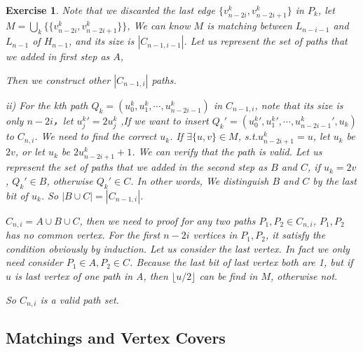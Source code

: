\documentclass[12pt,a4]{article}
\newtheorem{exercise}[theorem]{Exercise}
\begin{document}
\begin{exercise}
 Note that we discarded the last edge $\{ v_{n-2i}^k,v_{n-2i+1}^k\}$ in $P_k$, let $M = \bigcup_k \{\{v_{n-2i}^k,v_{n-2i+1}^k\}\}$, We can know $M$ is matching between $L_{n-i-1}$ and $L_{n-1}$ of 
 $H_{n-1}$, and its size is $|C_{n-1,i-1}|$. Let us represent the set of paths that we added in first step as
 $A$, 
 
 Then we construct other $|C_{n-1,i}|$ paths.
 
ii) For the kth path $Q_k = (u_0^k, u_1^k, \cdots, u_{n-2i-1}^k )$ in $C_{n-1,i}$, note that its size is only $n-2i$，let $u_j^k' = 2u^k_j$ ,If we want to insert $Q_k' = (u_0^k', u_1^k', \cdots, u_{n-2i-1}^k', u_k)$ to $C_{n,i}$. We need to find the correct $u_k$. If $\exists \{u, v\} \in M$, s.t.$u^k_{n-2i+1}=u$,  let $u_k$ be $2v$, or let $u_k$ be $2u^k_{n-2i+1} + 1$. We can verify that the path is valid. Let us represent the set of paths that we added in the second step as $B$ and $C$,
if $u_k = 2v$, $Q_k' \in B$,  otherwise $Q_k' \in C$. In other words, We distinguish $B$ and $C$ by the last bit of $u_k$. So $|B\cup C| = |C_{n-1,i}|$.

$C_{n,i}=A\cup B\cup C$, then we need to proof for any two paths $P_1, P_2 \in C_{n,i}$, $P_1, P_2$ has 
no common vertex. For the first $n-2i$ vertices in $P_1, P_2$, it satisfy the condition obviously by induction. Let us consider the last vertex. In fact we only need consider $P_1 \in A, P_2 \in C$. Because the last bit of last vertex both are 1, but if $u$ is last vertex of one path in A, then $\lfloor u / 2 \rfloor$ can be find in $M$, otherwise not. 

So $C_{n,i}$ is a valid path set.



 
 


\end{exercise}


\subsection{Matchings and Vertex Covers}
\end{document}
